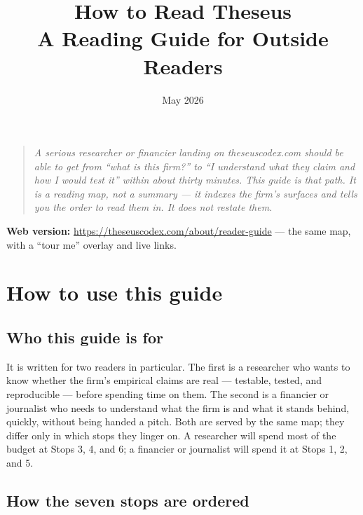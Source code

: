 \documentclass[11pt,letterpaper]{article}
\title{\textbf{How to Read Theseus}\\[4pt]\large A Reading Guide for Outside Readers}
\date{May 2026}
\author{}
\begin{document}
\maketitle
\thispagestyle{empty}

\vspace{1.5em}

\begin{quote}
\itshape
A serious researcher or financier landing on theseuscodex.com should be able to get from ``what is this firm?'' to ``I understand what they claim and how I would test it'' within about thirty minutes. This guide is that path. It is a reading map, not a summary --- it indexes the firm's surfaces and tells you the order to read them in. It does not restate them.
\end{quote}

\vspace{1em}

\textbf{Web version:} \url{https://theseuscodex.com/about/reader-guide} --- the same map, with a ``tour me'' overlay and live links.

\vspace{2em}

\tableofcontents
\newpage

\section{How to use this guide}

\subsection*{Who this guide is for}

It is written for two readers in particular. The first is a researcher who wants to know whether the firm's empirical claims are real --- testable, tested, and reproducible --- before spending time on them. The second is a financier or journalist who needs to understand what the firm is and what it stands behind, quickly, without being handed a pitch. Both are served by the same map; they differ only in which stops they linger on. A researcher will spend most of the budget at Stops 3, 4, and 6; a financier or journalist will spend it at Stops 1, 2, and 5.

\subsection*{How the seven stops are ordered}
\end{document}
